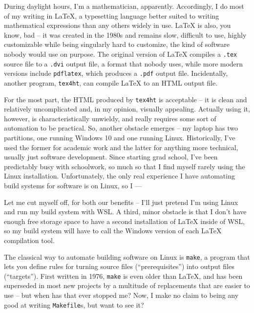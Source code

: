 \documentclass[11pt]{article}
\begin{document}
    During daylight hours, I'm a mathematician, apparently. Accordingly, I do most of my writing in LaTeX, a typesetting language better suited to writing mathematical expressions than any others widely in use. LaTeX is also, you know, bad -- it was created in the 1980s and remains slow, difficult to use, highly customizable while being singularly hard to customize, the kind of software nobody would use on purpose. The original version of LaTeX compiles a \texttt{.tex} source file to a \texttt{.dvi} output file, a format that nobody uses, while more modern versions include \texttt{pdflatex}, which produces a \texttt{.pdf} output file. Incidentally, another program, \texttt{tex4ht}, can compile LaTeX to an HTML output file. 

    For the most part, the HTML produced by \texttt{tex4ht} is acceptable -- it is clean and relatively uncomplicated and, in my opinion, visually appealing. Actually using it, however, is characteristically unwieldy, and really requires some sort of automation to be practical. So, another obstacle emerges -- my laptop has two partitions, one running Windows 10 and one running Linux. Historically, I've used the former for academic work and the latter for anything more technical, usually just software development. Since starting grad school, I've been predictably busy with schoolwork, so much so that I find myself rarely using the Linux installation. Unfortunately, the only real experience I have automating build systems for software is on Linux, so I ---

    Let me cut myself off, for both our benefits -- I'll just pretend I'm using Linux and run my build system with WSL. A third, minor obstacle is that I don't have enough free storage space to have a second installation of LaTeX inside of WSL, so my build system will have to call the Windows version of each LaTeX compilation tool. 

    The classical way to automate building software on Linux is \texttt{make}, a program that lets you define rules for turning source files (``prerequisites'') into output files (``targets''). First written in 1976, \texttt{make} is even older than LaTeX, and has been superseded in most new projects by a multitude of replacements that are easier to use -- but when has that ever stopped me? Now, I make no claim to being any good at writing \texttt{Makefile}s, but want to see it?
\end{document}
